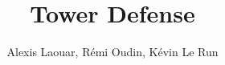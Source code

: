 \documentclass[pdf]{beamer}
\title{Tower Defense}
\author{Alexis Laouar, R\'emi Oudin, K\'evin Le Run}
\begin{document}
\begin{frame}
  \titlepage
\end{frame}
\end{document}

